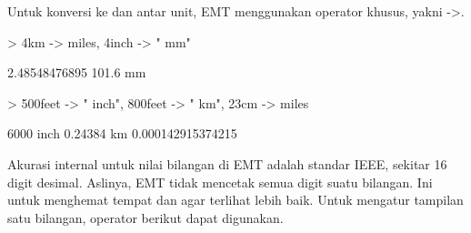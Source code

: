 \documentclass{report}
\begin{document}
\begin{eulernotebook}
\begin{eulercomment}
\begin{eulercomment}
\begin{eulercomment}
Untuk konversi ke dan antar unit, EMT menggunakan operator khusus,
yakni -\textgreater{}.
\end{eulercomment}
\begin{eulerprompt}
> 4km -> miles, 4inch -> " mm"
\end{eulerprompt}
\begin{euleroutput}
  2.48548476895
  101.6 mm
\end{euleroutput}
\begin{eulerprompt}
> 500feet -> " inch", 800feet -> " km", 23cm -> miles
\end{eulerprompt}
\begin{euleroutput}
  6000 inch
  0.24384 km
  0.000142915374215
\end{euleroutput}
\begin{eulercomment}
Akurasi internal untuk nilai bilangan di EMT adalah standar IEEE,
sekitar 16 digit desimal. Aslinya, EMT tidak mencetak semua digit
suatu bilangan. Ini untuk menghemat tempat dan agar terlihat lebih
baik. Untuk mengatur tampilan satu bilangan, operator berikut dapat
digunakan.


\end{eulercomment}
\end{eulercomment}
\end{eulercomment}
\end{eulernotebook}
\end{document}
